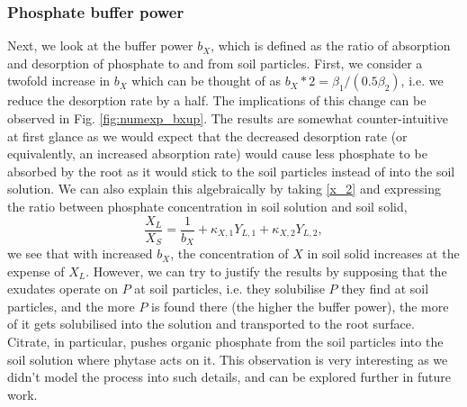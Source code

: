 \documentclass[11pt]{article}
\numberwithin{equation}{section}
\begin{document}
\subsubsection{Phosphate buffer power}
\label{sec:numexp_bx}
Next, we look at the buffer power $b_X$, which is defined as the ratio of absorption and desorption of phosphate to and from soil particles. First, we consider a twofold increase in $b_X$ which can be thought of as $b_X * 2 = \beta_1 / (0.5 \beta_2)$, i.e. we reduce the desorption rate by a half. The implications of this change can be observed in Fig. \ref{fig:numexp_bxup}. The results are somewhat counter-intuitive at first glance as we would expect that the decreased desorption rate (or equivalently, an increased absorption rate) would cause less phosphate to be absorbed by the root as it would stick to the soil particles instead of into the soil solution. We can also explain this algebraically by taking \eqref{x_2} and expressing the ratio between phosphate concentration in soil solution and soil solid,
\begin{equation}
    \frac{X_L}{X_S} = \frac{1}{b_X} + \kappa_{X,1} Y_{L,1} + \kappa_{X,2} Y_{L,2},
\end{equation}
we see that with increased $b_X$, the concentration of $X$ in soil solid increases at the expense of $X_L$. However, we can try to justify the results by supposing that the exudates operate on $P$ at soil particles, i.e. they solubilise $P$ they find at soil particles, and the more $P$ is found there (the higher the buffer power), the more of it gets solubilised into the solution and transported to the root surface. Citrate, in particular, pushes organic phosphate from the soil particles into the soil solution where phytase acts on it. This observation is very interesting as we didn't model the process into such details, and can be explored further in future work.
\end{document}

